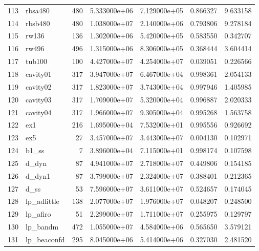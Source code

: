 \begin{tabular}{llrrrrr}
113 &                  rbsa480 &   480 &  5.333000e+06 &  7.129000e+05 &  0.866327 &   9.633158 \\
114 &                  rbsb480 &   480 &  1.038000e+07 &  2.140000e+06 &  0.793806 &   9.278184 \\
115 &                    rw136 &   136 &  1.302000e+06 &  5.420000e+05 &  0.583550 &   0.342707 \\
116 &                    rw496 &   496 &  1.315000e+06 &  8.306000e+05 &  0.368444 &   3.604414 \\
117 &                   tub100 &   100 &  4.427000e+07 &  4.254000e+07 &  0.039051 &   0.226566 \\
118 &                 cavity01 &   317 &  3.947000e+07 &  6.467000e+04 &  0.998361 &   2.054133 \\
119 &                 cavity02 &   317 &  1.823000e+07 &  3.743000e+04 &  0.997946 &   1.405985 \\
120 &                 cavity03 &   317 &  1.709000e+07 &  5.320000e+04 &  0.996887 &   2.020333 \\
121 &                 cavity04 &   317 &  1.966000e+07 &  9.305000e+04 &  0.995268 &   1.563758 \\
122 &                      ex1 &   216 &  1.695000e+04 &  7.532000e+01 &  0.995556 &   0.926692 \\
123 &                      ex5 &    27 &  3.457000e+07 &  3.443000e+07 &  0.004130 &   0.102971 \\
124 &                    b1\_ss &     7 &  3.896000e+04 &  7.115000e+01 &  0.998174 &   0.107598 \\
125 &                    d\_dyn &    87 &  4.941000e+07 &  2.718000e+07 &  0.449806 &   0.154185 \\
126 &                   d\_dyn1 &    87 &  3.799000e+07 &  2.324000e+07 &  0.388401 &   0.212365 \\
127 &                     d\_ss &    53 &  7.596000e+07 &  3.611000e+07 &  0.524657 &   0.174045 \\
128 &              lp\_adlittle &   138 &  2.077000e+07 &  1.976000e+07 &  0.048207 &   0.248500 \\
129 &                 lp\_afiro &    51 &  2.299000e+07 &  1.711000e+07 &  0.255975 &   0.129797 \\
130 &                 lp\_bandm &   472 &  1.055000e+07 &  4.584000e+06 &  0.565650 &   3.579121 \\
131 &              lp\_beaconfd &   295 &  8.045000e+06 &  5.414000e+06 &  0.327030 &   2.481520 \\

\end{tabular}
